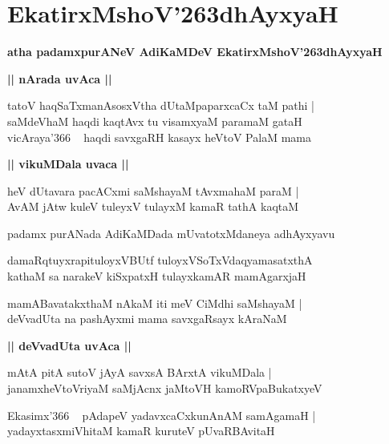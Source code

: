 \documentclass[twoside,12pt,openright]{book}
\def\S{\char'263}
\newcounter{shloka}[chapter]
\def\uvaca#1{\centerline{{\large\textbf{#1}}}}
\begin{document}
\chapter{EkatirxMshoV\S dhAyxyaH}

\begin{center}
{\LARGE\bfseries atha padamxpurANeV AdiKaMDeV EkatirxMshoV\S dhAyxyaH}
\end{center}

\uvaca{|| nArada uvAca ||}

\begin{shloka}
tatoV haqSaTxmanAsosxVtha dUtaMpaparxcaCx taM pathi |\\
saMdeVhaM haqdi kaqtAvx tu visamxyaM paramaM gataH \\
vicAraya\char'366 ~ haqdi savxgaRH kasayx heVtoV PalaM mama 
\end{shloka}

\uvaca{|| vikuMDala uvaca ||}

\begin{shloka}
heV dUtavara pacACxmi saMshayaM tAvxmahaM paraM |\\
AvAM jAtw kuleV tuleyxV tulayxM kamaR tathA kaqtaM 
\end{shloka}

\begin{center}
padamx purANada AdiKaMDada mUvatotxMdaneya adhAyxyavu
\end{center}

\begin{shloka}
damaRqtuyxrapituloyxVBUtf tuloyxVSoTxVdaqyamasatxthA \\
kathaM sa narakeV kiSxpatxH tulayxkamAR mamAgarxjaH 
\end{shloka}

\begin{shloka}
mamABavatakxthaM nAkaM iti meV CiMdhi saMshayaM |\\
deVvadUta na pashAyxmi mama savxgaRsayx kAraNaM 
\end{shloka}

\uvaca{|| deVvadUta uvAca ||}

\begin{shloka}
mAtA pitA sutoV jAyA savxsA BArxtA vikuMDala |\\
janamxheVtoVriyaM saMjAcnx jaMtoVH kamoRVpaBukatxyeV 
\end{shloka}

\begin{shloka}
Ekasimx\char'366 ~ pAdapeV yadavxcaCxkunAnAM samAgamaH |\\
yadayxtasxmiVhitaM kamaR kuruteV pUvaRBAvitaH 
\end{shloka}
\end{document}

